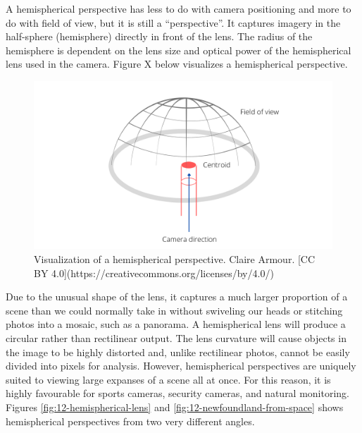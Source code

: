 \documentclass[
]{book}
\begin{document}
A hemispherical perspective has less to do with camera positioning and more to do with field of view, but it is still a ``perspective''. It captures imagery in the half-sphere (hemisphere) directly in front of the lens. The radius of the hemisphere is dependent on the lens size and optical power of the hemispherical lens used in the camera. Figure X below visualizes a hemispherical perspective.

\begin{figure}
\includegraphics[width=0.9\linewidth]{images/12-hemisphere-view} \caption{Visualization of a hemispherical perspective. Claire Armour. [CC BY 4.0](https://creativecommons.org/licenses/by/4.0/)}\label{fig:12-hemisphere-view}
\end{figure}

Due to the unusual shape of the lens, it captures a much larger proportion of a scene than we could normally take in without swiveling our heads or stitching photos into a mosaic, such as a panorama. A hemispherical lens will produce a circular rather than rectilinear output. The lens curvature will cause objects in the image to be highly distorted and, unlike rectilinear photos, cannot be easily divided into pixels for analysis. However, hemispherical perspectives are uniquely suited to viewing large expanses of a scene all at once. For this reason, it is highly favourable for sports cameras, security cameras, and natural monitoring. Figures \ref{fig:12-hemispherical-lens} and \ref{fig:12-newfoundland-from-space} shows hemispherical perspectives from two very different angles.
\end{document}
